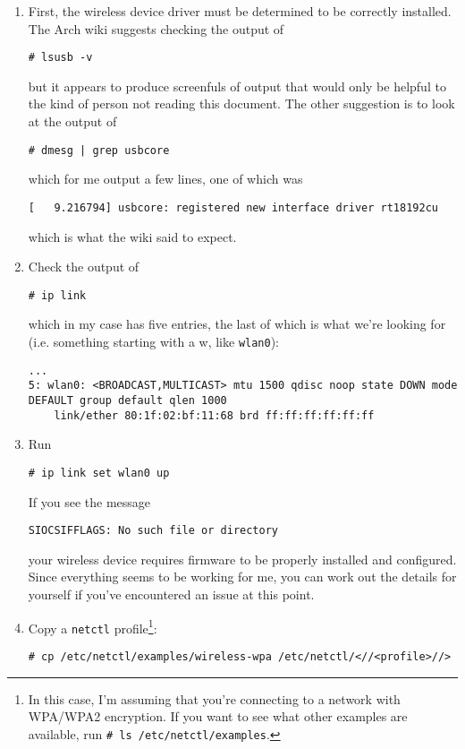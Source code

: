 \documentclass[12pt,letterpaper]{article}
\begin{document}
\begin{enumerate}
\item First, the wireless device driver must be determined to be correctly installed.  The Arch wiki suggests checking the output of
\begin{lstlisting}
# lsusb -v
\end{lstlisting}
but it appears to produce screenfuls of output that would only be helpful to the kind of person not reading this document.  The other suggestion is to look at the output of
\begin{lstlisting}
# dmesg | grep usbcore
\end{lstlisting}
which for me output a few lines, one of which was
\begin{lstlisting}
[   9.216794] usbcore: registered new interface driver rt18192cu
\end{lstlisting}
which is what the wiki said to expect.  

\item Check the output of
\begin{lstlisting}
# ip link
\end{lstlisting}
which in my case has five entries, the last of which is what we're looking for (i.e. something starting with a w, like \lstinline{wlan0}):
\begin{lstlisting}
...
5: wlan0: <BROADCAST,MULTICAST> mtu 1500 qdisc noop state DOWN mode DEFAULT group default qlen 1000
    link/ether 80:1f:02:bf:11:68 brd ff:ff:ff:ff:ff:ff
\end{lstlisting}

\item Run
\begin{lstlisting}
# ip link set wlan0 up
\end{lstlisting}
If you see the message
\begin{lstlisting}
SIOCSIFFLAGS: No such file or directory
\end{lstlisting}
your wireless device requires firmware to be properly installed and configured.  Since everything seems to be working for me, you can work out the details for yourself if you've encountered an issue at this point.


\item Copy a \lstinline{netctl} profile\footnote{In this case, I'm assuming that you're connecting to a network with WPA/WPA2 encryption.  If you want to see what other examples are available, run \lstinline{# ls /etc/netctl/examples}.}:
\begin{lstlisting}
# cp /etc/netctl/examples/wireless-wpa /etc/netctl/<//<profile>//>
\end{lstlisting}



\end{enumerate}
\end{document}
